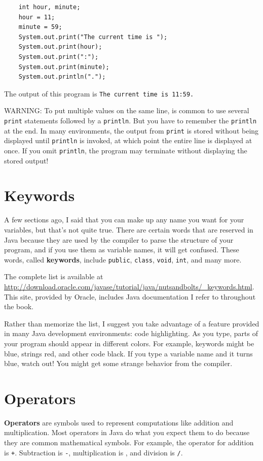 \begin{lstlisting}
    int hour, minute;
    hour = 11;
    minute = 59;
    System.out.print("The current time is ");
    System.out.print(hour);
    System.out.print(":");
    System.out.print(minute);
    System.out.println(".");
\end{lstlisting}
%
The output of this program is {\tt The current time is 11:59.}

WARNING: To put multiple values
on the same line, is common to use several {\tt print} statements
followed by a {\tt println}.
But you have to remember
the {\tt println} at the end.  In many environments, the
output from {\tt print} is stored without being displayed until
{\tt println} is invoked, at which point the entire
line is displayed at once.  If you omit {\tt println}, the
program may terminate without displaying the stored output!


\section{Keywords}

A few sections ago, I said that you can make up any name you
want for your variables, but that's not quite true.  There
are certain words that are reserved in Java because they are
used by the compiler to parse the structure of your program,
and if you use them as variable names, it will get confused.
These words, called {\bf keywords}, include {\tt public},
{\tt class}, {\tt void}, {\tt int}, and many more.

The complete list is available at \url{http://download.oracle.com/javase/tutorial/java/nutsandbolts/_keywords.html}.
This site, provided by Oracle, includes Java documentation I refer to
throughout the book.

Rather than memorize the list, I suggest you
take advantage of a feature provided in many Java development
environments: code highlighting.  As you type,
parts of your program should appear in different colors.  For
example, keywords might be blue, strings red, and other code
black.  If you type a variable name and it turns blue, watch
out!  You might get some strange behavior from the compiler.


\section{Operators}

{\bf Operators} are symbols used to represent
computations like addition and multiplication.  Most
operators in Java do what you expect them
to do because they are common mathematical symbols.  For
example, the operator for addition is {\tt +}.  Subtraction
is {\tt -}, multiplication is {\tt *}, and division is {\tt /}.

